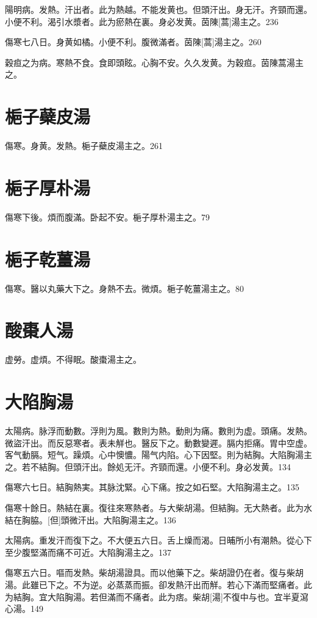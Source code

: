 \documentclass[12pt,oneside,UTF8,b5paper]{ctexbook}她她她她她她她
\begin{document}
陽明病。发熱。汗出者。此为熱越。不能发黄也。但頭汗出。身无汗。齐頸而還。小便不利。渴引水漿者。此为瘀熱在裏。身必发黄。茵陳[蒿]湯主之。236

傷寒七八日。身黄如橘。小便不利。腹微滿者。茵陳[蒿]湯主之。260

穀疸之为病。寒熱不食。食即頭眩。心胸不安。久久发黄。为穀疸。茵陳蒿湯主之。

\section{梔子蘗皮湯}

傷寒。身黄。发熱。梔子蘗皮湯主之。261

\section{梔子厚朴湯}

傷寒下後。煩而腹滿。卧起不安。梔子厚朴湯主之。79

\section{梔子乾薑湯}

傷寒。醫以丸藥大下之。身熱不去。微煩。梔子乾薑湯主之。80

\section{酸棗人湯}

虚勞。虚煩。不得眠。酸棗湯主之。

\section{大陷胸湯}

太陽病。脉浮而動數。浮則为風。數則为熱。動則为痛。數則为虚。頭痛。发熱。微盜汗出。而反惡寒者。表未觧也。醫反下之。動數變遲。膈内拒痛。胃中空虚。客气動膈。短气。躁煩。心中懊憹。陽气内陷。心下因堅。則为結胸。大陷胸湯主之。若不結胸。但頭汗出。餘処无汗。齐頸而還。小便不利。身必发黄。134

傷寒六七日。結胸熱実。其脉沈緊。心下痛。按之如石堅。大陷胸湯主之。135

傷寒十餘日。熱結在裏。復往來寒熱者。与大柴胡湯。但結胸。无大熱者。此为水結在胸脇。[但]頭微汗出。大陷胸湯主之。136

太陽病。重发汗而復下之。不大便五六日。舌上燥而渴。日晡所小有潮熱。從心下至少腹堅滿而痛不可近。大陷胸湯主之。137

傷寒五六日。嘔而发熱。柴胡湯證具。而以他藥下之。柴胡證仍在者。復与柴胡湯。此雖已下之。不为逆。必蒸蒸而振。卻发熱汗出而觧。若心下滿而堅痛者。此为結胸。宜大陷胸湯。若但滿而不痛者。此为痞。柴胡[湯]不復中与也。宜半夏瀉心湯。149
\end{document}

